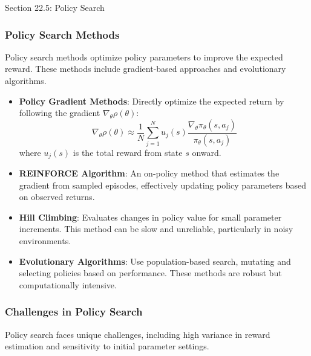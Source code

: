\begin{notes}{Section 22.5: Policy Search}
\begin{highlight}
    \end{highlight}
    
    \subsubsection*{Policy Search Methods}
    
    Policy search methods optimize policy parameters to improve the expected reward. These methods include gradient-based approaches and evolutionary algorithms.
    
    \begin{highlight}
    
        \begin{itemize}
            \item \textbf{Policy Gradient Methods}: Directly optimize the expected return by following the gradient $\nabla_\theta \rho(\theta)$:
            \[
            \nabla_\theta \rho(\theta) \approx \frac{1}{N} \sum_{j=1}^N u_j(s) \frac{\nabla_\theta \pi_\theta(s, a_j)}{\pi_\theta(s, a_j)}
            \]
            where $u_j(s)$ is the total reward from state $s$ onward.
            \item \textbf{REINFORCE Algorithm}: An on-policy method that estimates the gradient from sampled episodes, effectively updating policy parameters based on observed returns.
            \item \textbf{Hill Climbing}: Evaluates changes in policy value for small parameter increments. This method can be slow and unreliable, particularly in noisy environments.
            \item \textbf{Evolutionary Algorithms}: Use population-based search, mutating and selecting policies based on performance. These methods are robust but computationally intensive.
        \end{itemize}
    
    \end{highlight}
    
    \subsubsection*{Challenges in Policy Search}
    
    Policy search faces unique challenges, including high variance in reward estimation and sensitivity to initial parameter settings.
    
    \begin{highlight}
    

\end{highlight}
\end{notes}
